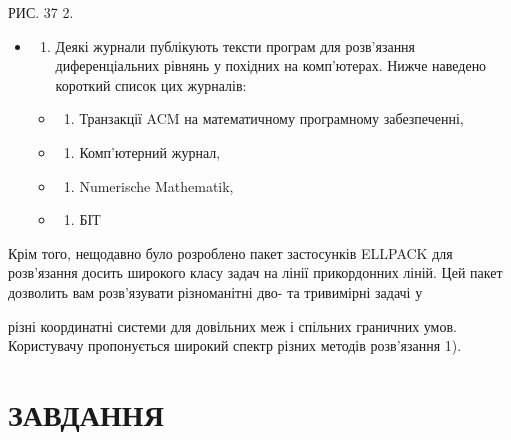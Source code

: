 \documentclass[
  ukrainian,
]{article}
\providecommand{\tightlist}{%
  \setlength{\itemsep}{0pt}\setlength{\parskip}{0pt}}
\begin{document}
РИС. 37 2.

\begin{itemize}
\item
  \begin{enumerate}
  \def\labelenumi{\arabic{enumi}.}
  \setcounter{enumi}{6}
  \tightlist
  \item
    Деякі журнали публікують тексти програм для розв'язання
    диференціальних рівнянь у похідних на комп'ютерах. Нижче наведено
    короткий список цих журналів:
  \end{enumerate}

  \begin{itemize}
  \tightlist
  \item
    \begin{enumerate}
    \def\labelenumi{\alph{enumi})}
    \tightlist
    \item
      Транзакції ACM на математичному програмному забезпеченні,
    \end{enumerate}
  \item
    \begin{enumerate}
    \def\labelenumi{\arabic{enumi})}
    \setcounter{enumi}{5}
    \tightlist
    \item
      Комп'ютерний журнал,
    \end{enumerate}
  \item
    \begin{enumerate}
    \def\labelenumi{\Alph{enumi})}
    \setcounter{enumi}{1}
    \tightlist
    \item
      Numerische Mathematik,
    \end{enumerate}
  \item
    \begin{enumerate}
    \def\labelenumi{\alph{enumi})}
    \setcounter{enumi}{17}
    \tightlist
    \item
      БІТ
    \end{enumerate}
  \end{itemize}
\end{itemize}

Крім того, нещодавно було розроблено пакет застосунків ELLPACK для
розв'язання досить широкого класу задач на лінії прикордонних ліній. Цей
пакет дозволить вам розв'язувати різноманітні дво- та тривимірні задачі
у

різні координатні системи для довільних меж і спільних граничних умов.
Користувачу пропонується широкий спектр різних методів розв'язання 1).

\section{ЗАВДАННЯ}\label{ux437ux430ux432ux434ux430ux43dux43dux44f-1}
\end{document}
